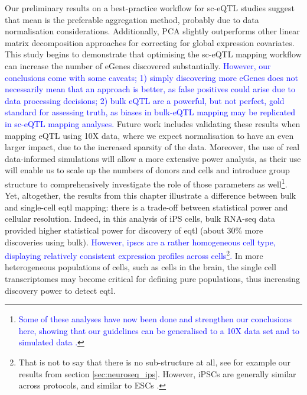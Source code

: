 Our preliminary results on a best-practice workflow for sc-eQTL studies suggest that mean is the preferable aggregation method, probably due to data normalisation considerations.
Additionally, PCA slightly outperforms other linear matrix decomposition approaches for correcting for global expression covariates.
This study begins to demonstrate that optimising the sc-eQTL mapping workflow can increase the number of eGenes discovered substantially. 
\textcolor{blue}{However, our conclusions come with some caveats; 1) simply discovering more eGenes does not necessarily mean that an approach is better, as false positives could arise due to data processing decisions; 2) bulk eQTL are a powerful, but not perfect, gold standard for assessing truth, as biases in bulk-eQTL mapping may be replicated in sc-eQTL mapping analyses.}
Future work includes validating these results when mapping eQTL using 10X data, where we expect normalisation to have an even larger impact, due to the increased sparsity of the data.
Moreover, the use of real data-informed simulations will allow a more extensive power analysis, as their use will enable us to scale up the numbers of donors and cells and introduce group structure to comprehensively investigate the role of those parameters as well\footnote{\textcolor{blue}{Some of these analyses have now been done and strengthen our conclusions here, showing that our guidelines can be generalised to a 10X data set and to simulated data \cite{cuomo2021optimising}.}}.
\\

Yet, altogether, the results from this chapter illustrate a difference between bulk and single-cell \gls{eqtl} mapping: there is a trade-off between statistical power and cellular resolution. 
Indeed, in this analysis of iPS cells, bulk RNA-seq data provided higher statistical power for discovery of \gls{eqtl} (about 30\% more discoveries using bulk). 
\textcolor{blue}{However, \glspl{ipsc} are a rather homogeneous cell type, displaying relatively consistent expression profiles across cells\footnote{That is not to say that there is no sub-structure at all, see for example our results from section \ref{sec:neuroseq_ips}. 
However, iPSCs are generally similar across protocols, and similar to ESCs \cite{bonder2019systematic}.}.}
In more heterogeneous populations of cells, such as cells in the brain, the single cell transcriptomes may become critical for defining pure populations, thus increasing discovery power to detect \gls{eqtl}.\\

